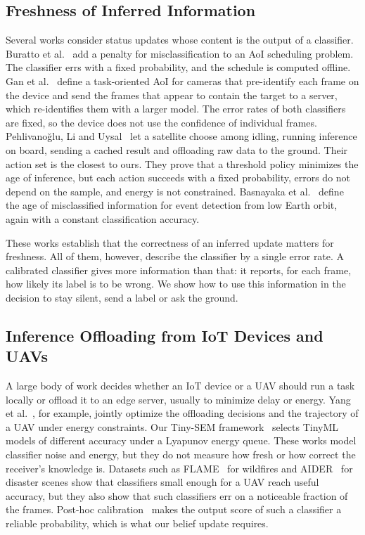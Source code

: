 \documentclass[journal]{IEEEtran}
\theoremstyle{remark}
\begin{document}
\subsection{Freshness of Inferred Information}
Several works consider status updates whose content is the output of a classifier. Buratto et al.~\cite{buratto2023misclass} add a penalty for misclassification to an AoI scheduling problem. The classifier errs with a fixed probability, and the schedule is computed offline. Gan et al.~\cite{gan2025taoi} define a task-oriented AoI for cameras that pre-identify each frame on the device and send the frames that appear to contain the target to a server, which re-identifies them with a larger model. The error rates of both classifiers are fixed, so the device does not use the confidence of individual frames. Pehlivano\u{g}lu, Li and Uysal~\cite{pehlivanoglu2026orbit} let a satellite choose among idling, running inference on board, sending a cached result and offloading raw data to the ground. Their action set is the closest to ours. They prove that a threshold policy minimizes the age of inference, but each action succeeds with a fixed probability, errors do not depend on the sample, and energy is not constrained. Basnayaka et al.~\cite{basnayaka2025aomi} define the age of misclassified information for event detection from low Earth orbit, again with a constant classification accuracy.

These works establish that the correctness of an inferred update matters for freshness. All of them, however, describe the classifier by a single error rate. A calibrated classifier gives more information than that: it reports, for each frame, how likely its label is to be wrong. We show how to use this information in the decision to stay silent, send a label or ask the ground.

\subsection{Inference Offloading from IoT Devices and UAVs}
A large body of work decides whether an IoT device or a UAV should run a task locally or offload it to an edge server, usually to minimize delay or energy. Yang et al.~\cite{yang2020uav}, for example, jointly optimize the offloading decisions and the trajectory of a UAV under energy constraints. Our Tiny-SEM framework~\cite{hosny2026tinysem} selects TinyML models of different accuracy under a Lyapunov energy queue. These works model classifier noise and energy, but they do not measure how fresh or how correct the receiver's knowledge is. Datasets such as FLAME~\cite{shamsoshoara2021flame} for wildfires and AIDER~\cite{kyrkou2020aider} for disaster scenes show that classifiers small enough for a UAV reach useful accuracy, but they also show that such classifiers err on a noticeable fraction of the frames. Post-hoc calibration~\cite{guo2017calibration} makes the output score of such a classifier a reliable probability, which is what our belief update requires.
\end{document}
